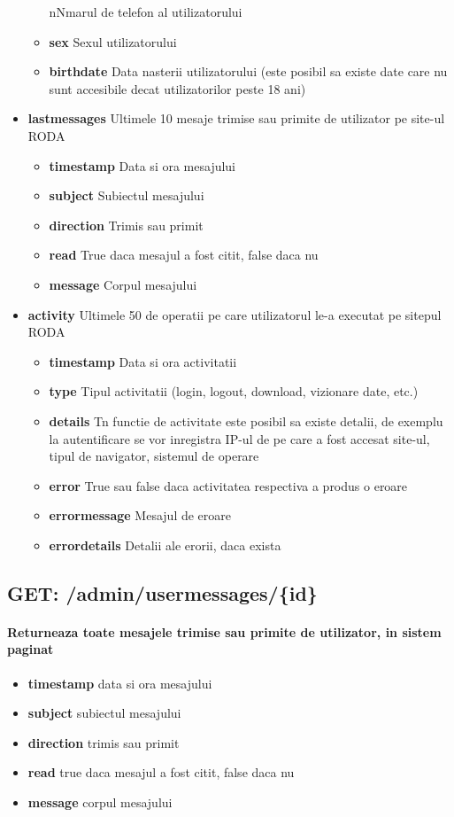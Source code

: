 \begin{itemize}
\begin{itemize}
 nNmarul de telefon al utilizatorului
\item \textbf{sex}
 Sexul utilizatorului
\item \textbf{birthdate}
 Data nasterii utilizatorului (este posibil sa existe date care nu sunt accesibile decat utilizatorilor peste 18 ani)
 \end{itemize}
\item\textbf{lastmessages}
 Ultimele 10 mesaje trimise sau primite de utilizator pe site-ul RODA \begin{itemize}
\item \textbf{timestamp}
 Data si ora mesajului
\item \textbf{subject}
 Subiectul mesajului
\item \textbf{direction}
 Trimis sau primit
\item \textbf{read}
 True daca mesajul a fost citit, false daca nu
\item \textbf{message}
 Corpul mesajului
 \end{itemize}
\item\textbf{activity}
 Ultimele 50 de operatii pe care utilizatorul le-a executat pe sitepul RODA \begin{itemize}
\item \textbf{timestamp}
 Data si ora activitatii
\item \textbf{type}
 Tipul activitatii (login, logout, download, vizionare date, etc.)
\item \textbf{details}
 Tn functie de activitate este posibil sa existe detalii, de exemplu la autentificare se vor inregistra IP-ul de pe care a fost accesat site-ul, tipul de navigator, sistemul de operare
\item \textbf{error}
 True sau false daca activitatea respectiva a produs o eroare
\item \textbf{errormessage}
 Mesajul de eroare
\item \textbf{errordetails}
 Detalii ale erorii, daca exista
 \end{itemize}
 \end{itemize}
 \subsection*{GET: /admin/usermessages/\{id\}}

\paragraph{Returneaza toate mesajele trimise sau primite de utilizator, in sistem paginat}
\begin{itemize}
\item \textbf{timestamp}
 data si ora mesajului
\item \textbf{subject}
 subiectul mesajului
\item \textbf{direction}
 trimis sau primit
\item \textbf{read}
 true daca mesajul a fost citit, false daca nu
\item \textbf{message}
 corpul mesajului
 \end{itemize}
